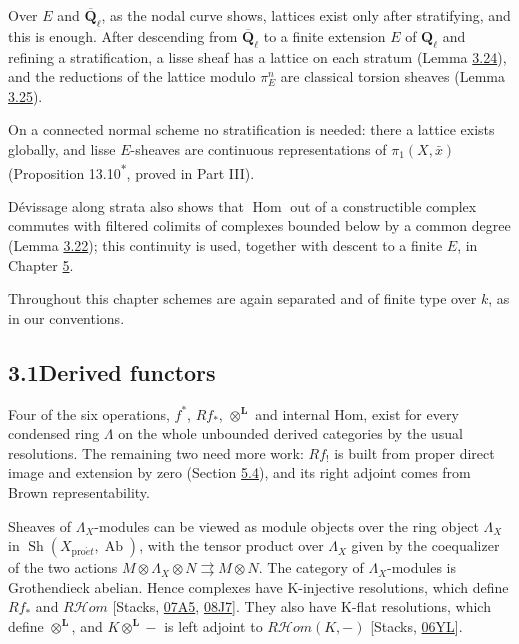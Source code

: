 \documentclass[11pt]{article}
\newcommand{\bpout}[1]{#1\textsuperscript{\hyperlink{bp-outside}{\ensuremath{\ast}}}}
\providecommand{\Hom}{}\renewcommand{\Hom}{\operatorname{Hom}}
\providecommand{\Sh}{}\renewcommand{\Sh}{\operatorname{Sh}}
\providecommand{\cHom}{}\renewcommand{\cHom}{R\mathcal{H}\!om}
\begin{document}
Over \(E\) and \(\overline{\mathbf Q}_\ell\), as the nodal curve shows, lattices exist only after stratifying, and this is enough. After descending from \(\overline{\mathbf Q}_\ell\) to a finite extension \(E\) of \(\mathbf Q_\ell\) and refining a stratification, a lisse sheaf has a lattice on each stratum (Lemma \hyperref[bp269]{3.24}), and the reductions of the lattice modulo \(\pi_E^n\) are classical torsion sheaves (Lemma \hyperref[bp274]{3.25}).

On a connected normal scheme no stratification is needed: there a lattice exists globally, and lisse \(E\)-sheaves are continuous representations of \(\pi_1(X,\bar x)\) (Proposition \bpout{13.10}, proved in Part III).

Dévissage along strata also shows that \(\Hom\) out of a constructible complex commutes with filtered colimits of complexes bounded below by a common degree (Lemma \hyperref[bp260]{3.22}); this continuity is used, together with descent to a finite \(E\), in Chapter \hyperref[bp407]{5}.

Throughout this chapter schemes are again separated and of finite type over \(k\), as in our conventions.

\subsection*{\texorpdfstring{3.1\quad Derived functors}{3.1 Derived functors}}
\label{bp195}%
\label{bp196}%
Four of the six operations, \(f^*\), \(Rf_*\), \(\otimes^{\mathbf L}\) and internal Hom, exist for every condensed ring \(\Lambda\) on the whole unbounded derived categories by the usual resolutions. The remaining two need more work: \(Rf_!\) is built from proper direct image and extension by zero (Section \hyperref[bp459]{5.4}), and its right adjoint comes from Brown representability.

Sheaves of \(\Lambda_X\)-modules can be viewed as module objects over the ring object \(\Lambda_X\) in \(\Sh(X_{\mathrm{pro}\acute{e}t},\operatorname{Ab})\), with the tensor product over \(\Lambda_X\) given by the coequalizer of the two actions \(M\otimes\Lambda_X\otimes N\rightrightarrows M\otimes N\). The category of \(\Lambda_X\)-modules is Grothendieck abelian. Hence complexes have K-injective resolutions, which define \(Rf_*\) and \(\cHom\) [Stacks, \href{https://stacks.math.columbia.edu/tag/07A5}{07A5}, \href{https://stacks.math.columbia.edu/tag/08J7}{08J7}]. They also have K-flat resolutions, which define \(\otimes^{\mathbf L}\), and \(K\otimes^{\mathbf L}-\) is left adjoint to \(\cHom(K,-)\) [Stacks, \href{https://stacks.math.columbia.edu/tag/06YL}{06YL}].
\end{document}

